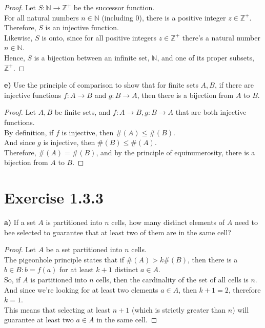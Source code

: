\documentclass[titlepage, letterpaper, fleqn]{article}
\newcommand{\spacepls}{\vspace{5mm}}
\begin{document}
\begin{proof}
Let \(S \colon \mathbb{N} \to \mathbb{Z}^+\) be the successor function.\\
For all natural numbers \(n \in \mathbb{N}\) (including 0), there is a positive integer \(z \in \mathbb{Z}^+\).\\
Therefore, \(S\) is an injective function.\\
Likewise, \(S\) is onto, since for all positive integers \(z \in \mathbb{Z}^+\) there's a natural number \(n \in \mathbb{N}\).\\
Hence, \(S\) is a bijection between an infinite set, \(\mathbb{N}\), and one of its proper subsets, \(\mathbb{Z}^+\).
\end{proof}

\spacepls

{\large \textbf{e)} Use the principle of comparison to show that for finite sets \(A,B\), if there are injective functions \(f \colon A \to B\) and \(g \colon B \to A\), then there is a bijection from \(A\) to \(B\).}

\begin{proof}
Let \(A,B\) be finite sets, and \(f \colon A \to B, g \colon B \to A\) that are both injective functions.\\
By definition, if \(f\) is injective, then \(\#(A) \leq \#(B)\).\\
And since \(g\) is injective, then \(\#(B) \leq \#(A)\).\\
Therefore, \(\#(A) = \#(B)\), and by the principle of equinumerosity, there is a bijection from \(A\) to \(B\).
\end{proof}

\section{Exercise 1.3.3}

{\large \textbf{a)} If a set \(A\) is partitioned into \(n\) cells, how many distinct elements of \(A\) need to bee selected to guarantee that at least two of them are in the same cell?}

\begin{proof}
Let \(A\) be a set partitioned into \(n\) cells.\\
The pigeonhole principle states that if \(\#(A) > k\#(B)\), then there is a \(b \in B \colon b = f(a)\) for at least \(k + 1\) distinct \(a \in A\).\\
So, if \(A\) is partitioned into \(n\) cells, then the cardinality of the set of all cells is \(n\).\\
And since we're looking for at least two elements \(a \in A\), then \(k+1 = 2\), therefore \(k = 1\).\\
This means that selecting at least \(n + 1\) (which is strictly greater than \(n\)) will guarantee at least two \(a \in A\) in the same cell.
\end{proof}
\end{document}
